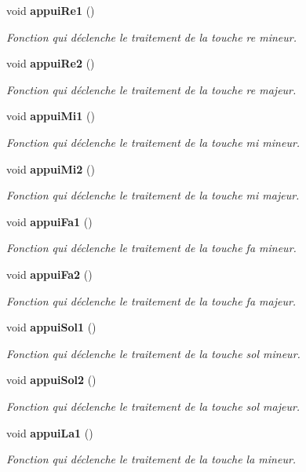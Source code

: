 \begin{DoxyCompactItemize}
\item 
void {\bf appui\-Re1} ()
\begin{DoxyCompactList}\small\item\em Fonction qui déclenche le traitement de la touche re mineur. \end{DoxyCompactList}\item 
void {\bf appui\-Re2} ()
\begin{DoxyCompactList}\small\item\em Fonction qui déclenche le traitement de la touche re majeur. \end{DoxyCompactList}\item 
void {\bf appui\-Mi1} ()
\begin{DoxyCompactList}\small\item\em Fonction qui déclenche le traitement de la touche mi mineur. \end{DoxyCompactList}\item 
void {\bf appui\-Mi2} ()
\begin{DoxyCompactList}\small\item\em Fonction qui déclenche le traitement de la touche mi majeur. \end{DoxyCompactList}\item 
void {\bf appui\-Fa1} ()
\begin{DoxyCompactList}\small\item\em Fonction qui déclenche le traitement de la touche fa mineur. \end{DoxyCompactList}\item 
void {\bf appui\-Fa2} ()
\begin{DoxyCompactList}\small\item\em Fonction qui déclenche le traitement de la touche fa majeur. \end{DoxyCompactList}\item 
void {\bf appui\-Sol1} ()
\begin{DoxyCompactList}\small\item\em Fonction qui déclenche le traitement de la touche sol mineur. \end{DoxyCompactList}\item 
void {\bf appui\-Sol2} ()
\begin{DoxyCompactList}\small\item\em Fonction qui déclenche le traitement de la touche sol majeur. \end{DoxyCompactList}\item 
void {\bf appui\-La1} ()
\begin{DoxyCompactList}\small\item\em Fonction qui déclenche le traitement de la touche la mineur. \end{DoxyCompactList}\item 

\end{DoxyCompactItemize}
